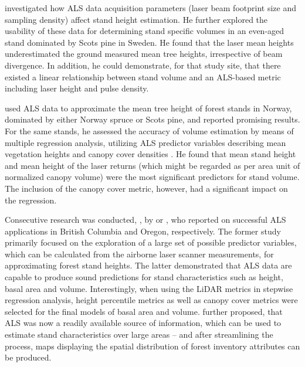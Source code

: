 \textcite{Nilsson.1996} investigated how \ac{ALS} data acquisition parameters (laser beam footprint size and sampling density) affect 
stand height estimation.
He further explored the usability of these data for determining stand specific volumes in 
an even-aged stand dominated by Scots pine in Sweden. 
He found that the laser mean heights underestimated the ground measured mean tree heights, irrespective of beam divergence. 
In addition, he could demonstrate, for that study site, that there existed a linear relationship between 
stand volume and an \ac{ALS}-based metric including laser height and pulse density.

\textcite{Nsset.1997} used \ac{ALS} data to approximate the mean tree height of forest stands in Norway,
 dominated by either Norway spruce or Scots pine, and reported promising results.
 For the same stands, he assessed the accuracy of volume estimation
 by means of multiple regression analysis, utilizing \ac{ALS} predictor variables describing 
 mean vegetation heights and canopy cover densities \parencite{Naesset.1997}.
 He found that mean stand height and  mean height of the laser returns 
 (which might be regarded as per area unit of normalized canopy volume) were the most significant predictors for stand volume.
 The inclusion of the canopy cover metric, however, had a significant impact on the regression.
 
 Consecutive research was conducted, \eg, by \textcite{Magnussen.1998} or \textcite{Means.2000}, who reported on successful 
 \ac{ALS} applications in British Columbia and Oregon, respectively. The former study primarily focused on the
 exploration of a large set of possible predictor variables, which can be calculated from the airborne laser scanner measurements,
 for approximating forest stand heights. The latter demonstrated that \ac{ALS} data are capable to produce sound predictions
 for stand characteristics such as height, basal area and volume. Interestingly, 
 when using the \ac{LiDAR} metrics in stepwise regression analysis, height percentile metrics as well as canopy cover metrics 
 were selected for the final models of basal area and volume. \textcite{Means.2000} further proposed, that \ac{ALS} was now 
 a readily available source of information, which can be used to estimate stand characteristics over large areas -- 
 and after streamlining the process, maps displaying the spatial distribution of forest inventory attributes can be produced.
 
